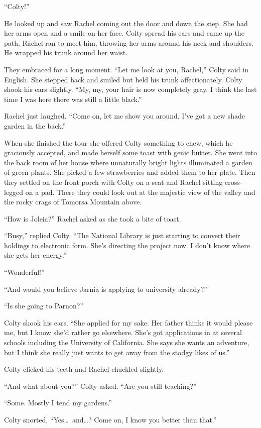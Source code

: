 ``Colty!''

He looked up and saw Rachel coming out the door and down the step. She had her arms open and a
smile on her face. Colty spread his ears and came up the path. Rachel ran to meet him, throwing
her arms around his neck and shoulders. He wrapped his trunk around her waist.

They embraced for a long moment. ``Let me look at you, Rachel,'' Colty said in English. She
stepped back and smiled but held his trunk affectionately. Colty shook his ears slightly. ``My,
my, your hair is now completely gray. I think the last time I was here there was still a little
black.''

Rachel just laughed. ``Come on, let me show you around. I've got a new shade garden in the
back.''

When she finished the tour she offered Colty something to chew, which he graciously accepted,
and made herself some toast with genic butter. She went into the back room of her house where
unnaturally bright lights illuminated a garden of green plants. She picked a few strawberries
and added them to her plate. Then they settled on the front porch with Colty on a seat and
Rachel sitting cross-legged on a pad. There they could look out at the majestic view of the
valley and the rocky crags of Tomorsa Mountain above.

``How is Joleia?'' Rachel asked as she took a bite of toast.

``Busy,'' replied Colty. ``The National Library is just starting to convert their holdings to
electronic form. She's directing the project now. I don't know where she gets her energy.''

``Wonderful!''

``And would you believe Jarnia is applying to university already?''

``Is she going to Parnon?''

Colty shook his ears. ``She applied for my sake. Her father thinks it would please me, but I
know she'd rather go elsewhere. She's got applications in at several schools including the
University of California. She says she wants an adventure, but I think she really just wants to
get away from the stodgy likes of us.''

Colty clicked his teeth and Rachel chuckled slightly.

``And what about you?'' Colty asked. ``Are you still teaching?''

``Some. Mostly I tend my gardens.''

Colty snorted. ``Yes\ldots\ and\ldots? Come on, I know you better than that.''

